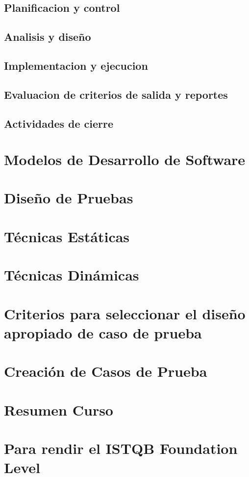 \documentclass[12pt,a4paper,twoside]{article}
\begin{document}
\subsection{Planificacion y control}

\subsection{Analisis y diseño}

\subsection{Implementacion y ejecucion}

\subsection{Evaluacion de criterios de salida y reportes}

\subsection{Actividades de cierre}






\newpage

\section{Modelos de Desarrollo de Software}


\newpage

\section{Diseño de Pruebas}


\newpage

\section{Técnicas Estáticas}


\newpage

\section{Técnicas Dinámicas}


\newpage

\section{Criterios para seleccionar el diseño apropiado de caso de prueba}


\newpage

\section{Creación de Casos de Prueba}


\newpage

\section{Resumen Curso}


\newpage

\section{Para rendir el ISTQB Foundation Level}


\newpage
\end{document}

